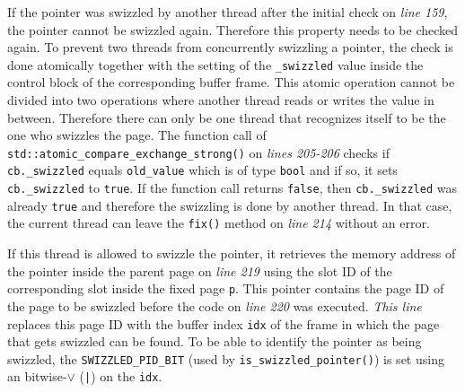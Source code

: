 	If the pointer was swizzled by another thread after the initial check on \emph{line 159}, the pointer cannot be swizzled again. Therefore this property needs to be checked again. To prevent two threads from concurrently swizzling a pointer, the check is done atomically together with the setting of the \lstinline{_swizzled} value inside the control block of the corresponding buffer frame. This atomic operation cannot be divided into two operations where another thread reads or writes the value in between. Therefore there can only be one thread that recognizes itself to be the one who swizzles the page. The function call of \lstinline{std::atomic_compare_exchange_strong()} on \emph{lines 205-206} checks if \lstinline{cb._swizzled} equals \lstinline{old_value} which is of type \lstinline{bool} and if so, it sets \lstinline{cb._swizzled} to \lstinline{true}. If the function call returns \lstinline{false}, then \lstinline{cb._swizzled} was already \lstinline{true} and therefore the swizzling is done by another thread. In that case, the current thread can leave the \lstinline{fix()} method on \emph{line 214} without an error.
	
	If this thread is allowed to swizzle the pointer, it retrieves the memory address of the pointer inside the parent page on \emph{line 219} using the slot ID of the corresponding slot inside the fixed page \lstinline{p}. This pointer contains the page ID of the page to be swizzled before the code on \emph{line 220} was executed. \emph{This line} replaces this page ID with the buffer index \lstinline{idx} of the frame in which the page that gets swizzled can be found. To be able to identify the pointer as being swizzled, the \lstinline{SWIZZLED_PID_BIT} (used by \lstinline{is_swizzled_pointer()}) is set using an bitwise-$\vee$ (\lstinline{|}) on the \lstinline{idx}.
